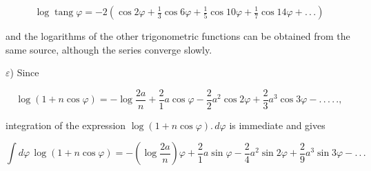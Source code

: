 \[
\log\operatorname{tang}\varphi = -2\left(\cos2\varphi + \tfrac{1}{3}\cos6\varphi + \tfrac{1}{5}\cos10\varphi + \tfrac{1}{7}\cos14\varphi + .\,.\,.\right)
\]

\noindent and the logarithms of the other trigonometric functions can be obtained from the same source, although the series
converge slowly.

$\varepsilon$) Since

\[
\log(1+n\cos\varphi) = -\log\frac{2a}{n} + \frac{2}{1}a\cos\varphi - \frac{2}{2}a^2\cos2\varphi + \frac{2}{3}a^3\cos3\varphi - .\,.\,.\,.\,.,
\]

\noindent integration of the expression $\log(1+n\cos\varphi).\,d\varphi$ is immediate and gives

\[
\int d\varphi\,\log(1+n\cos\varphi) = -\left(\log\frac{2a}{n}\right)\varphi + \frac{2}{1}a\sin\varphi - \frac{2}{4}a^2\sin2\varphi + \frac{2}{9}a^3\sin3\varphi - .\,.\,. 
\]


